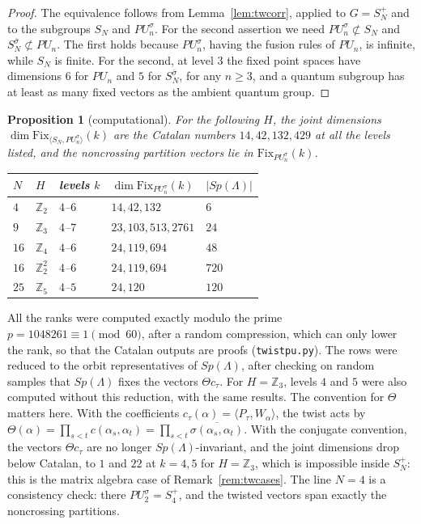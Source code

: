 \documentclass[11pt]{amsart}
\newtheorem{proposition}[theorem]{Proposition}
\theoremstyle{definition}
\theoremstyle{remark}
\theoremstyle{plain}
\numberwithin{equation}{section}
\numberwithin{table}{section}
\newcommand{\Z}{\mathbb Z}
\newcommand{\Fix}{\mathrm{Fix}}
\begin{document}
\begin{proof}
The equivalence follows from Lemma~\ref{lem:twcorr}, applied to $G=S_N^+$ and to the subgroups $S_N$ and $PU_n^\sigma$. For the second assertion we need $PU_n^\sigma\not\subset S_N$ and $S_N^{\bar\sigma}\not\subset PU_n$. The first holds because $PU_n^\sigma$, having the fusion rules of $PU_n$, is infinite, while $S_N$ is finite. For the second, at level $3$ the fixed point spaces have dimensions $6$ for $PU_n$ and $5$ for $S_N^{\bar\sigma}$, for any $n\ge3$, and a quantum subgroup has at least as many fixed vectors as the ambient quantum group.
\end{proof}

\begin{proposition}[computational]\label{prop:pures}
For the following $H$, the joint dimensions $\dim\Fix_{\langle S_N,PU_n^\sigma\rangle}(k)$ are the Catalan numbers $14,42,132,429$ at all the levels listed, and the noncrossing partition vectors lie in $\Fix_{PU_n^\sigma}(k)$.
\begin{center}
\begin{tabular}{@{}lllll@{}}\toprule
$N$ & $H$ & levels $k$ & $\dim\Fix_{PU_n^\sigma}(k)$ & $|Sp(\Lambda)|$\\\midrule
$4$ & $\Z_2$ & $4$--$6$ & $14,42,132$ & $6$\\
$9$ & $\Z_3$ & $4$--$7$ & $23,103,513,2761$ & $24$\\
$16$ & $\Z_4$ & $4$--$6$ & $24,119,694$ & $48$\\
$16$ & $\Z_2^2$ & $4$--$6$ & $24,119,694$ & $720$\\
$25$ & $\Z_5$ & $4$--$5$ & $24,120$ & $120$\\\bottomrule
\end{tabular}
\end{center}
\end{proposition}

All the ranks were computed exactly modulo the prime $p=1048261\equiv1\pmod{60}$, after a random compression, which can only lower the rank, so that the Catalan outputs are proofs (\texttt{twistpu.py}). The rows were reduced to the orbit representatives of $Sp(\Lambda)$, after checking on random samples that $Sp(\Lambda)$ fixes the vectors $\Theta c_\tau$. For $H=\Z_3$, levels $4$ and $5$ were also computed without this reduction, with the same results. The convention for $\Theta$ matters here. With the coefficients $c_\tau(\alpha)=\langle P_\tau,W_\alpha\rangle$, the twist acts by $\Theta(\alpha)=\prod_{s<t}c(\alpha_s,\alpha_t)=\prod_{s<t}\overline{\sigma(\alpha_s,\alpha_t)}$. With the conjugate convention, the vectors $\Theta c_\tau$ are no longer $Sp(\Lambda)$-invariant, and the joint dimensions drop below Catalan, to $1$ and $22$ at $k=4,5$ for $H=\Z_3$, which is impossible inside $S_N^+$: this is the matrix algebra case of Remark~\ref{rem:twcases}. The line $N=4$ is a consistency check: there $PU_2^\sigma=S_4^+$, and the twisted vectors span exactly the noncrossing partitions.
\end{document}
